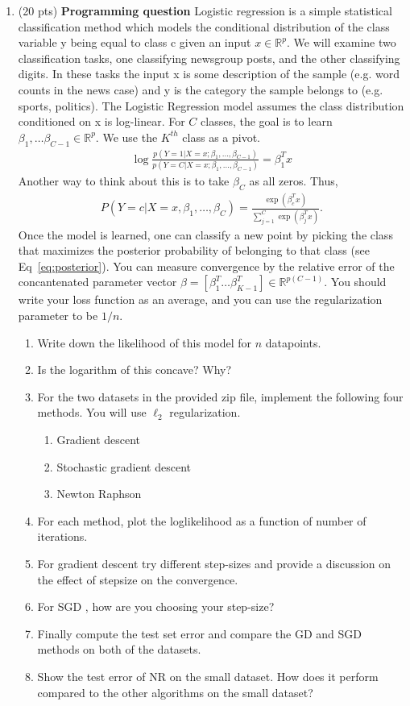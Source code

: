 \documentclass[11pt]{article}
\newcommand{\bi}{\begin{enumerate}}
\newcommand{\ib}{\end{enumerate}}
\newcommand{\p}{\item}
\begin{document}
\begin{enumerate}
\item (20 pts) \textbf{Programming question} 
Logistic regression is a simple statistical classification method which models the conditional
distribution of the class variable y being equal to class c given an input $x\in \mathbb{R}^p$.
 We will  examine two classification tasks, one classifying newsgroup posts, and the other classifying digits. In these tasks the input x is some description of the sample (e.g. word counts in the news case) and y is the category the sample belongs to (e.g. sports, politics). The Logistic Regression model assumes the class distribution conditioned on x is log-linear. For $C$ classes, the goal is to learn $\beta_1,\dots \beta_{C-1}\in \mathbb{R}^p$. We use the $K^{th}$ class as a pivot.
 \begin{align*}
 \log \frac{p(Y=1|X=x;\beta_{1},\dots,\beta_{C-1})}{p(Y=C|X=x;\beta_{1},\dots,\beta_{C-1})}=\beta_1^T x
 \end{align*}
 Another way to think about this is to take $\beta_C$ as all zeros. Thus,
 \begin{align}\label{eq:posterior}
 P(Y=c|X=x,\beta_{1},\dots,\beta_{C})=\frac{\exp(\beta_c^T x)}{\sum_{j=1}^C\exp(\beta_j^Tx)}.
 \end{align}
 Once the model is learned, one can classify a new point by picking the class that maximizes the posterior probability of belonging to that class (see Eq~\ref{eq:posterior}). You can measure convergence by the relative error of the concantenated parameter vector $\beta=[\beta_1^T \dots \beta_{K-1}^T]\in\mathbb{R}^{p(C-1)}$. You should write your loss function as an average, and you can use the regularization parameter to be $1/n$.
 \bi
 \p Write down the likelihood of this model for $n$ datapoints.
 \p [Extra credit] Is the logarithm of this concave? Why? 
 \p For the two datasets in the provided zip file, implement the following four methods. You will use $\ell_2$ regularization.
\bi
\p Gradient descent
\p Stochastic gradient descent
\p Newton Raphson
\ib
\p For each method, plot the loglikelihood as a function of number of iterations.
\p For gradient descent  try different step-sizes and provide a discussion on the effect of stepsize on the convergence.
\p For SGD , how are you choosing your step-size? 
\p Finally compute the test set error and compare the GD and SGD methods on both of the datasets.
\p Show the test error of NR on the small dataset. How does it perform compared to the other algorithms on the small dataset?
 \ib
\end{enumerate}
\end{document}
